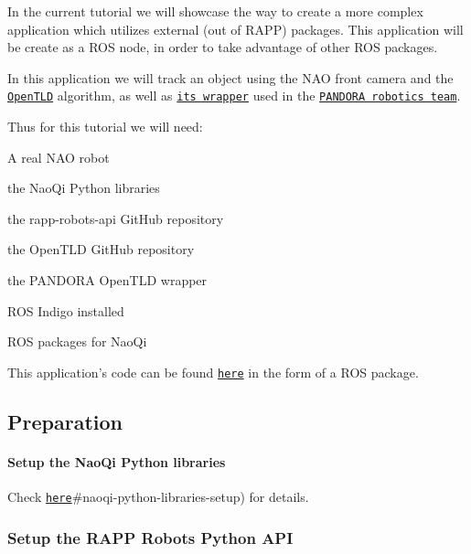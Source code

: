 In the current tutorial we will showcase the way to create a more complex application which utilizes external (out of R\-A\-P\-P) packages. This application will be create as a R\-O\-S node, in order to take advantage of other R\-O\-S packages.

In this application we will track an object using the N\-A\-O front camera and the \href{https://github.com/pandora-auth-ros-pkg/open_tld}{\tt Open\-T\-L\-D} algorithm, as well as \href{https://github.com/pandora-auth-ros-pkg/pandora_tld}{\tt its wrapper} used in the \href{http://pandora.ee.auth.gr/}{\tt P\-A\-N\-D\-O\-R\-A robotics team}.

Thus for this tutorial we will need\-:
\begin{DoxyItemize}
\item A real N\-A\-O robot
\item the Nao\-Qi Python libraries
\item the rapp-\/robots-\/api Git\-Hub repository
\item the Open\-T\-L\-D Git\-Hub repository
\item the P\-A\-N\-D\-O\-R\-A Open\-T\-L\-D wrapper
\item R\-O\-S Indigo installed
\item R\-O\-S packages for Nao\-Qi
\end{DoxyItemize}

This application's code can be found \href{https://github.com/rapp-project/rapps-nao/tree/master/3.track_object_TLD/tld_tracker_nao}{\tt here} in the form of a R\-O\-S package.

\subsection*{Preparation}

\paragraph*{Setup the Nao\-Qi Python libraries}

Check \href{https://github.com/rapp-project/rapp-platform/wiki/Create-a-remote-robotic-application-for-NAO-in-Python-(novice}{\tt here}\#naoqi-\/python-\/libraries-\/setup) for details.

\subsubsection*{Setup the R\-A\-P\-P Robots Python A\-P\-I}

